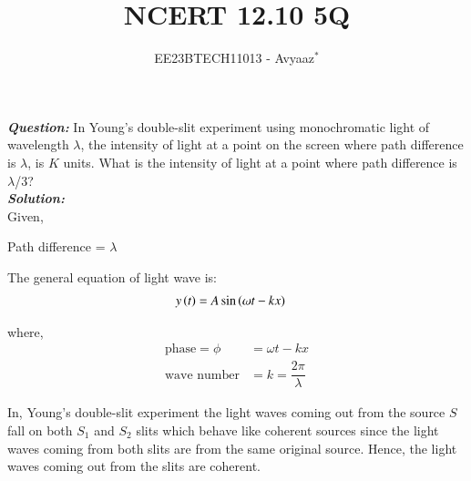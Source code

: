 \documentclass[journal,12pt,twocolumn]{IEEEtran}
\theoremstyle{remark}
\begin{document}

\vspace{3cm}

\title{NCERT 12.10 5Q}
\author{EE23BTECH11013 - Avyaaz$^{*}$%
}
\maketitle
\newpage
\bigskip

\renewcommand{\thefigure}{\theenumi}
\renewcommand{\thetable}{\arabic{table}}

\large\textbf{\textsl{Question:}}
In Young’s double-slit experiment using monochromatic light of wavelength $\lambda$, the intensity of light at a point on the screen where path difference is $\lambda$, is $K$ units. What is the intensity of light at a
point where path difference is $\lambda$/3?\\
\large\textbf{\textsl{Solution:}}\\
Given,\\
\begin{table}[htbp]
\centering

\vspace{0.2cm}
\caption{\normalsize $Parameters$}
\label{tab:parameters}
\end{table}

\hspace*{1cm}Path difference = $\lambda$

The general equation of light wave is:
\begin{align}
       y\left(t\right) &= A\sin{(\omega t - kx)} \label{eq:lightwave}
\end{align}

 where,
 \begin{align}
 \text{phase} = \phi &= \omega t - kx \nonumber \\
 \text{wave number} &= k = \dfrac{2\pi}{\lambda} \nonumber 
 \end{align}

In, Young's double-slit experiment the light waves coming out from the source $S$ fall on both $S_1$ and $S_2$ slits which behave like coherent sources since the light waves coming from both slits are from the same original source. Hence, the light waves coming out from the slits are coherent.

\vspace{0.3cm}
\end{document}
